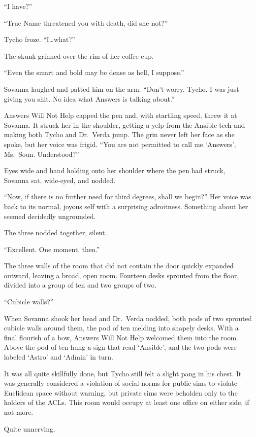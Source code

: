``I have?''

``True Name threatened you with death, did she not?''

Tycho froze. ``I\ldots what?''

The skunk grinned over the rim of her coffee cup.

``Even the smart and bold may be dense as hell, I suppose.''

Sovanna laughed and patted him on the arm. ``Don't worry, Tycho. I was just giving you shit. No idea what Answers is talking about.''

Answers Will Not Help capped the pen and, with startling speed, threw it at Sovanna. It struck her in the shoulder, getting a yelp from the Ansible tech and making both Tycho and Dr.~Verda jump. The grin never left her face as she spoke, but her voice was frigid. ``You are not permitted to call me `Answers', Ms.~Soun. Understood?''

Eyes wide and hand holding onto her shoulder where the pen had struck, Sovanna sat, wide-eyed, and nodded.

``Now, if there is no further need for third degrees, shall we begin?'' Her voice was back to its normal, joyous self with a surprising adroitness. Something about her seemed decidedly ungrounded.

The three nodded together, silent.

``Excellent. One moment, then.''

The three walls of the room that did not contain the door quickly expanded outward, leaving a broad, open room. Fourteen desks sprouted from the floor, divided into a group of ten and two groups of two.

``Cubicle walls?''

When Sovanna shook her head and Dr.~Verda nodded, both pods of two sprouted cubicle walls around them, the pod of ten melding into shapely desks. With a final flourish of a bow, Answers Will Not Help welcomed them into the room. Above the pod of ten hung a sign that read `Ansible', and the two pods were labeled `Astro' and `Admin' in turn.

It was all quite skillfully done, but Tycho still felt a slight pang in his chest. It was generally considered a violation of social norms for public sims to violate Euclidean space without warning, but private sims were beholden only to the holders of the ACLs. This room would occupy at least one office on either side, if not more.

Quite unnerving.

